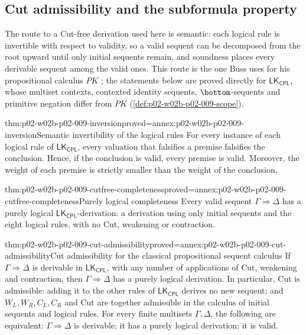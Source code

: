 \subsection{Cut admissibility and the subformula property}

The route to a Cut-free derivation used here is semantic: each logical rule
is invertible with respect to validity, so a valid sequent can be decomposed
from the root upward until only initial sequents remain, and soundness
places every derivable sequent among the valid ones.  This route is the one
Buss uses for his propositional calculus \(PK\)
\cite[Secs.~1.2.7--1.2.11, pp.~13--16]{Buss1998Intro}; the statements below
are proved directly for \(\mathsf{LK}_{\mathsf{CPL}}\), whose multiset
contexts, contexted identity sequents, \(\bottom\)-sequents and primitive
negation differ from \(PK\) (\cref{def:p02-w02b-p02-009-scope}).

\begin{hblemma}{thm:p02-w02b-p02-009-inversion}{proved=annex:p02-w02b-p02-009-inversion}{Semantic invertibility of the logical rules}
For every instance of each logical rule of \(\mathsf{LK}_{\mathsf{CPL}}\),
every valuation that falsifies a premise falsifies the conclusion.  Hence, if
the conclusion is valid, every premise is valid.  Moreover, the weight of
each premise is strictly smaller than the weight of the conclusion.
\end{hblemma}

\begin{hbtheorem}{thm:p02-w02b-p02-009-cutfree-completeness}{proved=annex:p02-w02b-p02-009-cutfree-completeness}{Purely logical completeness}
Every valid sequent \(\Gamma\Rightarrow\Delta\) has a purely logical
\(\mathsf{LK}_{\mathsf{CPL}}\)-derivation: a derivation using only initial
sequents and the eight logical rules, with no Cut, weakening or
contraction.
\end{hbtheorem}

\begin{hbtheorem}{thm:p02-w02b-p02-009-cut-admissibility}{proved=annex:p02-w02b-p02-009-cut-admissibility}{Cut admissibility for the classical propositional sequent calculus}
If \(\Gamma\Rightarrow\Delta\) is derivable in \(\mathsf{LK}_{\mathsf{CPL}}\),
with any number of applications of Cut, weakening and contraction, then
\(\Gamma\Rightarrow\Delta\) has a purely logical derivation.  In particular,
Cut is admissible: adding it to the other rules of
\(\mathsf{LK}_{\mathsf{CPL}}\) derives no new sequent; and
\(W_L,W_R,C_L,C_R\) and Cut are together admissible in the calculus of
initial sequents and logical rules.  For every finite multisets
\(\Gamma,\Delta\), the following are equivalent: \(\Gamma\Rightarrow\Delta\)
is derivable; it has a purely logical derivation; it is valid.
\end{hbtheorem}

